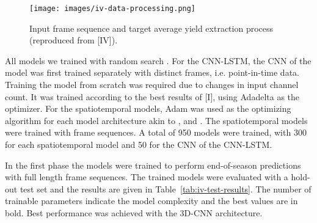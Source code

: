 \begin{figure}[htb]
    \centering
    \texttt{[image: images/iv-data-processing.png]}
    \caption{Input frame sequence and target average yield extraction process (reproduced from [IV]).} 
    \label{fig:iv-data-processing}
\end{figure}

All models we trained with random search \cite{Bergstra2012}. For the CNN-LSTM, the CNN of the model was first trained separately with distinct frames, i.e. point-in-time data. Training the model from scratch was required due to changes in input channel count. It was trained according to the best results of [I], using Adadelta \cite{Zeiler2012} as the optimizer. For the spatiotemporal models, Adam \cite{Kingma2015} was used as the optimizing algorithm for each model architecture akin to \cite{Rustowicz2019}, \cite{Yaramasu2020} and \cite{Liu2017}. The spatiotemporal models were trained with frame sequences. A total of 950 models were trained, with 300 for each spatiotemporal model and 50 for the CNN of the CNN-LSTM. 

In the first phase the models were trained to perform end-of-season predictions with full length frame sequences. The trained models were evaluated with a hold-out test set and the results are given in Table~\ref{tab:iv-test-results}. The number of trainable parameters indicate the model complexity and the best values are in bold. Best performance was achieved with the 3D-CNN architecture. 
 
